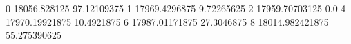 0 18056.828125 97.12109375
1 17969.4296875 9.72265625
2 17959.70703125 0.0
4 17970.19921875 10.4921875
6 17987.01171875 27.3046875
8 18014.982421875 55.275390625
